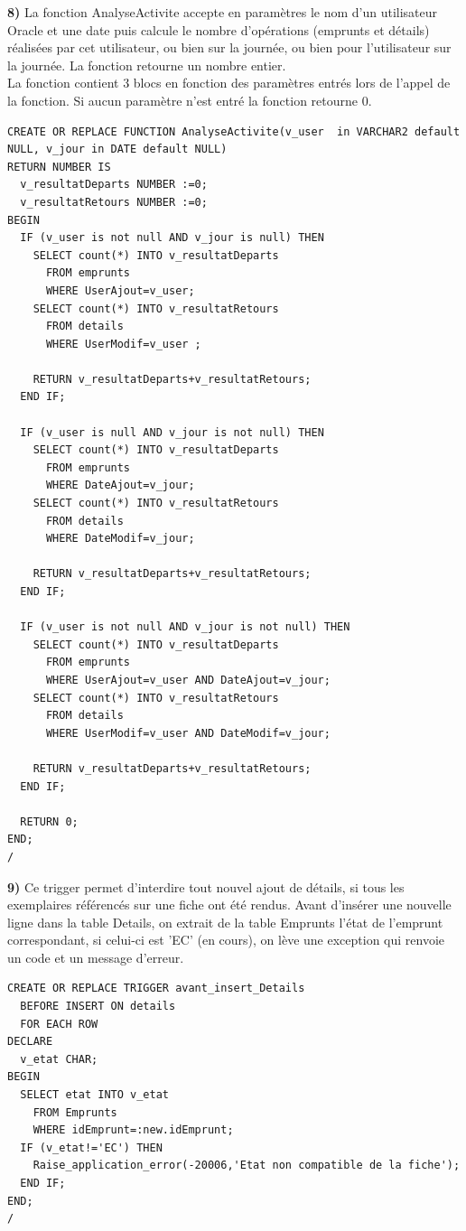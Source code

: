 \documentclass[a4paper,12pt]{article}
\begin{document}
\textbf {8)} La fonction AnalyseActivite accepte en paramètres le nom d’un utilisateur Oracle et une date puis calcule le nombre d’opérations (emprunts et détails) réalisées par cet utilisateur, ou bien sur la journée, ou bien pour l’utilisateur sur la journée. La fonction retourne un nombre entier. \\
La fonction contient 3 blocs en fonction des paramètres entrés lors de l'appel de la fonction. Si aucun paramètre n'est entré la fonction retourne 0.

\begin{lstlisting}
CREATE OR REPLACE FUNCTION AnalyseActivite(v_user  in VARCHAR2 default NULL, v_jour in DATE default NULL)
RETURN NUMBER IS
  v_resultatDeparts NUMBER :=0;
  v_resultatRetours NUMBER :=0;
BEGIN
  IF (v_user is not null AND v_jour is null) THEN
    SELECT count(*) INTO v_resultatDeparts 
      FROM emprunts
      WHERE UserAjout=v_user;
    SELECT count(*) INTO v_resultatRetours
      FROM details
      WHERE UserModif=v_user ;

    RETURN v_resultatDeparts+v_resultatRetours;
  END IF;

  IF (v_user is null AND v_jour is not null) THEN
    SELECT count(*) INTO v_resultatDeparts 
      FROM emprunts
      WHERE DateAjout=v_jour;
    SELECT count(*) INTO v_resultatRetours
      FROM details
      WHERE DateModif=v_jour;

    RETURN v_resultatDeparts+v_resultatRetours;
  END IF;

  IF (v_user is not null AND v_jour is not null) THEN
    SELECT count(*) INTO v_resultatDeparts 
      FROM emprunts
      WHERE UserAjout=v_user AND DateAjout=v_jour;
    SELECT count(*) INTO v_resultatRetours
      FROM details
      WHERE UserModif=v_user AND DateModif=v_jour;

    RETURN v_resultatDeparts+v_resultatRetours;
  END IF;

  RETURN 0;
END;
/
\end{lstlisting}

\textbf {9)} Ce trigger permet d'interdire tout nouvel ajout de détails, si tous les exemplaires référencés sur une fiche ont été rendus. Avant d'insérer une nouvelle ligne dans la table Details, on extrait de la table Emprunts l'état de l'emprunt correspondant, si celui-ci est 'EC' (en cours), on lève une exception qui renvoie un code et un message d'erreur.

\begin{lstlisting}
CREATE OR REPLACE TRIGGER avant_insert_Details
  BEFORE INSERT ON details
  FOR EACH ROW
DECLARE
  v_etat CHAR;
BEGIN
  SELECT etat INTO v_etat
    FROM Emprunts
    WHERE idEmprunt=:new.idEmprunt;
  IF (v_etat!='EC') THEN
    Raise_application_error(-20006,'Etat non compatible de la fiche');
  END IF;
END;
/
\end{lstlisting}
\end{document}
